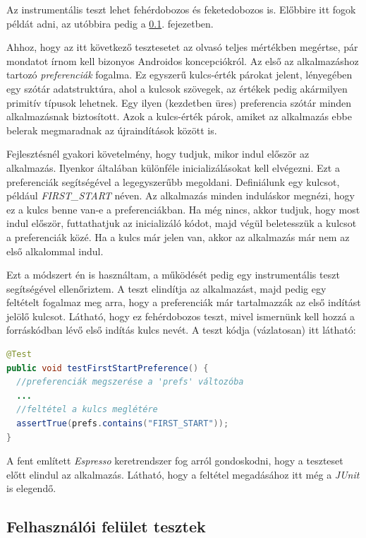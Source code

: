 \documentclass[12pt,a4paper]{article}
\begin{document}
	Az instrumentális teszt lehet fehérdobozos és feketedobozos is. Előbbire itt fogok példát adni, az utóbbira pedig a \ref{felhasznaloi_fel_teszt}. fejezetben.
	
	Ahhoz, hogy az itt következő tesztesetet az olvasó teljes mértékben megértse, pár mondatot írnom kell bizonyos Androidos koncepciókról. Az első az alkalmazáshoz tartozó \textit{preferenciák} fogalma. Ez egyszerű kulcs-érték párokat jelent, lényegében egy szótár adatstruktúra, ahol a kulcsok szövegek, az értékek pedig akármilyen primitív típusok lehetnek. Egy ilyen (kezdetben üres) preferencia szótár minden alkalmazásnak biztosított. Azok a kulcs-érték párok, amiket az alkalmazás ebbe belerak megmaradnak az újraindítások között is.
	
	Fejlesztésnél gyakori követelmény, hogy tudjuk, mikor indul először az alkalmazás. Ilyenkor általában különféle inicializálásokat kell elvégezni. Ezt a preferenciák segítségével a legegyszerűbb megoldani. Definiálunk egy kulcsot, például \textit{FIRST\_START} néven. Az alkalmazás minden induláskor megnézi, hogy ez a kulcs benne van-e a preferenciákban.  Ha még nincs, akkor tudjuk, hogy most indul először, futtathatjuk az inicializáló kódot, majd végül beletesszük a kulcsot a preferenciák közé. Ha a kulcs már jelen van, akkor az alkalmazás már nem az első alkalommal indul.
	
	Ezt a módszert én is használtam, a működését pedig egy instrumentális teszt segítségével ellenőriztem. A teszt elindítja az alkalmazást, majd pedig egy feltételt fogalmaz meg arra, hogy a preferenciák már tartalmazzák az első indítást jelölő kulcsot. Látható, hogy ez fehérdobozos teszt, mivel ismernünk kell hozzá a forráskódban lévő első indítás kulcs nevét. A teszt kódja (vázlatosan) itt látható:
	
	\begin{lstlisting}[language=Java]
@Test
public void testFirstStartPreference() {
  //preferenciák megszerése a 'prefs' változóba
  ...
  //feltétel a kulcs meglétére
  assertTrue(prefs.contains("FIRST_START"));
}
	\end{lstlisting}
	
	A fent említett \textit{Espresso} keretrendszer fog arról gondoskodni, hogy a teszteset előtt elindul az alkalmazás. Látható, hogy a feltétel megadásához itt még a \textit{JUnit} is elegendő. 
	
	\subsection{Felhasználói felület tesztek}\label{felhasznaloi_fel_teszt}
	
\end{document}
